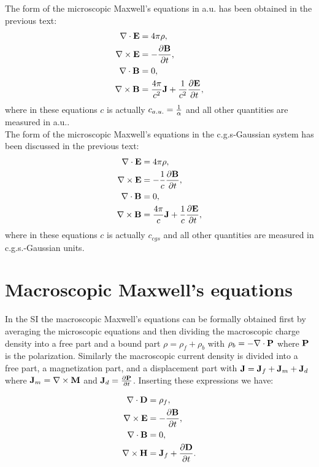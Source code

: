 \documentclass[12pt,a4paper,twoside]{report}
\begin{document}
{{\color{web-blue} The form of the microscopic Maxwell's equations
in a.u. has been obtained in the previous text:
\begin{align}
\nabla \cdot {\bf E} &= 4 \pi \rho, \\
\nabla \times {\bf E} &= -{\partial {\bf B} \over \partial t}, \\
\nabla \cdot {\bf B} &= 0, \\
\nabla \times {\bf B} &= {4 \pi \over c^2} {\bf J}+ {1\over c^2}
{\partial {\bf E} \over \partial t}, 
\end{align}
where in these equations $c$ is actually $c_{a.u.}={1\over \alpha}$ and all 
other quantities are measured in a.u..
}
\\

{\color{orange} The form of the microscopic Maxwell's equations
in the c.g.s-Gaussian system has been discussed in the previous text:
\begin{align}
\nabla \cdot {\bf E} &= 4 \pi \rho, \\
\nabla \times {\bf E} &= -{1\over c} {\partial {\bf B} \over \partial t}, \\
\nabla \cdot {\bf B} &= 0, \\
\nabla \times {\bf B} &= {4 \pi \over c} {\bf J}+ {1\over c}
{\partial {\bf E} \over \partial t}, 
\end{align}
where in these equations $c$ is actually $c_{cgs}$ and all 
other quantities are measured in c.g.s.-Gaussian units.
}

\newpage
{\color{coral}\section{Macroscopic Maxwell's equations}}
\color{black}

In the SI the macroscopic Maxwell's equations can be formally obtained 
first by averaging the microscopic equations and then dividing the 
macroscopic charge density into a free part and a
bound part $\rho=\rho_f+\rho_b$ with $\rho_b=-\nabla \cdot {\bf P}$
where ${\bf P}$ is the polarization.
Similarly the macroscopic current density is divided into a free part, a 
magnetization part, 
and a displacement part with ${\bf J}={\bf J}_f + {\bf J}_m + {\bf J}_d$ where
${\bf J}_m=\nabla \times {\bf M}$ and ${\bf J}_d={\partial {\bf P}\over 
\partial t}$.
Inserting these expressions we have:

\begin{tcolorbox}
\begin{align}
\nabla \cdot {\bf D} &= \rho_f, \\
\nabla \times {\bf E} &= -{\partial {\bf B} \over \partial t}, \\
\nabla \cdot {\bf B} &= 0, \\
\nabla \times {\bf H} &= {\bf J}_f+ {\partial {\bf D} \over \partial t}. 
\end{align}
\end{tcolorbox}

}
\end{document}
